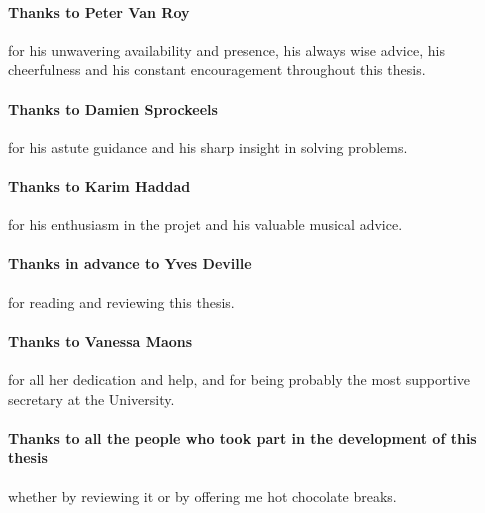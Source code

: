 \documentclass[11pt,table,xcdraw]{report}
\begin{document}
\paragraph{Thanks to Peter Van Roy} for his unwavering availability and presence, his always wise advice, his cheerfulness and his constant encouragement throughout this thesis.
\paragraph{Thanks to Damien Sprockeels} for his astute guidance and his sharp insight in solving problems.
\paragraph{Thanks to Karim Haddad} for his enthusiasm in the projet and his valuable musical advice.
\paragraph{Thanks in advance to Yves Deville} for reading and reviewing this thesis.
\paragraph{Thanks to Vanessa Maons} for all her dedication and help, and for being probably the most supportive secretary at the University.
\paragraph{Thanks to all the people who took part in the development of this thesis} whether by reviewing it or by offering me hot chocolate breaks.
\restoregeometry 

\tableofcontents








%
\printbibliography

%
\appendix






\end{document}
